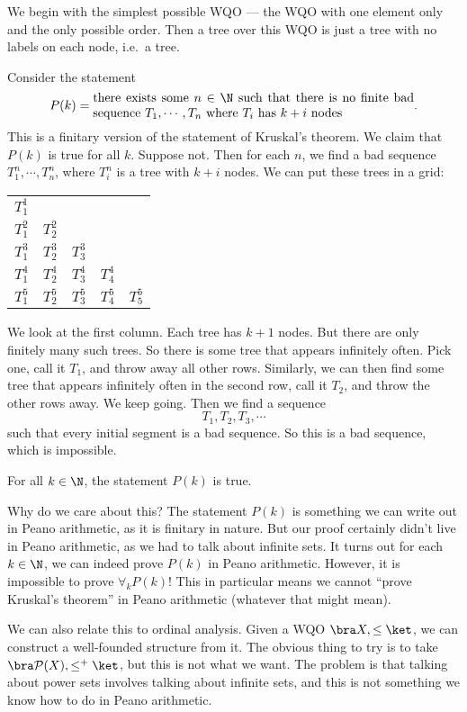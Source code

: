\documentclass[a4paper]{article}
\begin{document}
We begin with the simplest possible WQO --- the WQO with one element only and the only possible order. Then a tree over this WQO is just a tree with no labels on each node, i.e.\ a tree.

Consider the statement
\[
  P(k) = \parbox{9cm}{there exists some $n \in \N$ such that there is no finite bad sequence $T_1, \cdots, T_n$ where $T_i$ has $k + i$ nodes}.
\]
This is a finitary version of the statement of Kruskal's theorem. We claim that $P(k)$ is true for all $k$. Suppose not. Then for each $n$, we find a bad sequence $T_1^n, \cdots, T_n^n$, where $T_i^n$ is a tree with $k + i$ nodes. We can put these trees in a grid:
\begin{center}
  \begin{tabular}{ccccc}
    $T_1^1$\\
    $T_1^2$ & $T_2^2$\\
    $T_1^3$ & $T_2^3$ & $T_3^3$\\
    $T_1^4$ & $T_2^4$ & $T_3^4$ & $T_4^4$\\
    $T_1^5$ & $T_2^5$ & $T_3^5$ & $T_4^5$ & $T_5^5$\\
  \end{tabular}
\end{center}
We look at the first column. Each tree has $k + 1$ nodes. But there are only finitely many such trees. So there is some tree that appears infinitely often. Pick one, call it $T_1$, and throw away all other rows. Similarly, we can then find some tree that appears infinitely often in the second row, call it $T_2$, and throw the other rows away. We keep going. Then we find a sequence
\[
  T_1, T_2, T_3, \cdots
\]
such that every initial segment is a bad sequence. So this is a bad sequence, which is impossible.

\begin{prop}
  For all $k \in \N$, the statement $P(k)$ is true.
\end{prop}
Why do we care about this? The statement $P(k)$ is something we can write out in Peano arithmetic, as it is finitary in nature. But our proof certainly didn't live in Peano arithmetic, as we had to talk about infinite sets. It turns out for each $k \in \N$, we can indeed prove $P(k)$ in Peano arithmetic. However, it is impossible to prove $\forall_k P(k)$! This in particular means we cannot ``prove Kruskal's theorem'' in Peano arithmetic (whatever that might mean).

We can also relate this to ordinal analysis. Given a WQO $\bra X, \leq\ket$, we can construct a well-founded structure from it. The obvious thing to try is to take $\bra \mathcal{P}(X), \leq^+\ket$, but this is not what we want. The problem is that talking about power sets involves talking about infinite sets, and this is not something we know how to do in Peano arithmetic.
\end{document}
